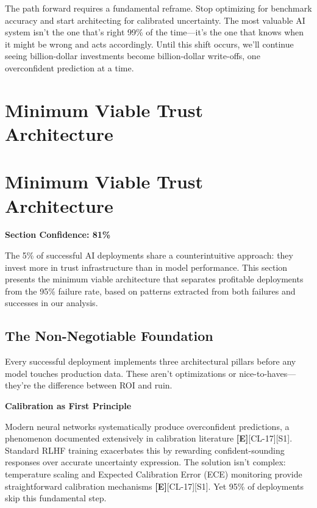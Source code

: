 \documentclass[a4paper,11pt]{article}
\newcommand{\elabel}{\textbf{\textcolor{ecolor}{[E]}}}
\begin{document}
The path forward requires a fundamental reframe. Stop optimizing for benchmark accuracy and start architecting for calibrated uncertainty. The most valuable AI system isn't the one that's right 99\% of the time—it's the one that knows when it might be wrong and acts accordingly. Until this shift occurs, we'll continue seeing billion-dollar investments become billion-dollar write-offs, one overconfident prediction at a time.

\clearpage
\section{Minimum Viable Trust Architecture}

\section{Minimum Viable Trust Architecture}

\textbf{Section Confidence: 81\%}\par

The 5\% of successful AI deployments share a counterintuitive approach: they invest more in trust infrastructure than in model performance. This section presents the minimum viable architecture that separates profitable deployments from the 95\% failure rate, based on patterns extracted from both failures and successes in our analysis.


\subsection{The Non-Negotiable Foundation}

Every successful deployment implements three architectural pillars before any model touches production data. These aren't optimizations or nice-to-haves—they're the difference between ROI and ruin.


\textbf{Calibration as First Principle}\par

Modern neural networks systematically produce overconfident predictions, a phenomenon documented extensively in calibration literature \elabel{}[CL-17]\textcolor{primary}{[S1]}. Standard RLHF training exacerbates this by rewarding confident-sounding responses over accurate uncertainty expression. The solution isn't complex: temperature scaling and Expected Calibration Error (ECE) monitoring provide straightforward calibration mechanisms \elabel{}[CL-17]\textcolor{primary}{[S1]}. Yet 95\% of deployments skip this fundamental step.
\end{document}
